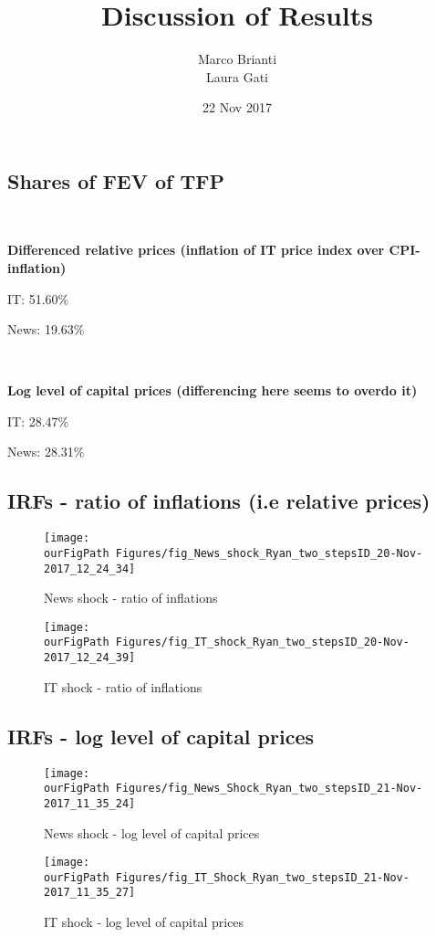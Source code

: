 \documentclass{article}
\title{Discussion of Results}
\author{Marco Brianti\\Laura Gati}
\date{22 Nov 2017}
\def \ourFigPath {../../} %
\begin{document}
\maketitle

\subsection*{Shares of FEV of TFP}

\

\textbf{Differenced relative prices (inflation of IT price index over CPI-inflation)}

IT: 51.60\%

\noindent News: 19.63\%

\

 \textbf{Log level of capital prices (differencing here seems to overdo it)}

IT: 28.47\%

\noindent News: 28.31\%



\newpage
\subsection*{IRFs - ratio of inflations (i.e relative prices)}

\begin{figure}[h!]
\centering
\texttt{[image: \\ourFigPath Figures/fig\_News\_shock\_Ryan\_two\_stepsID\_20-Nov-2017\_12\_24\_34]}
\caption{News shock - ratio of inflations}
\end{figure}

\begin{figure}[h!]
\centering
\texttt{[image: \\ourFigPath Figures/fig\_IT\_shock\_Ryan\_two\_stepsID\_20-Nov-2017\_12\_24\_39]}
\caption{IT shock - ratio of inflations}
\end{figure}

\newpage
\subsection*{IRFs - log level of capital prices}

\begin{figure}[h!]
\centering
\texttt{[image: \\ourFigPath Figures/fig\_News\_Shock\_Ryan\_two\_stepsID\_21-Nov-2017\_11\_35\_24]}
\caption{News shock - log level of capital prices}
\end{figure}

\begin{figure}[h!]
\centering
\texttt{[image: \\ourFigPath Figures/fig\_IT\_Shock\_Ryan\_two\_stepsID\_21-Nov-2017\_11\_35\_27]}
\caption{IT shock - log level of capital prices}
\end{figure}
\end{document}
